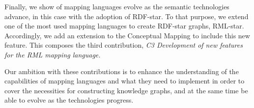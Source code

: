 Finally, we show of mapping languages evolve as the semantic technologies advance, in this case with the adoption of RDF-star. To that purpose, we extend one of the most used mapping languages to create RDF-star graphs, RML-star. Accordingly, we add an extension to the Conceptual Mapping to include this new feature. This composes the third contribution, \textit{C3 Development of new features for the RML mapping language.}

Our ambition with these contributions is to enhance the understanding of the capabilities of mapping languages and what they need to implement in order to cover the necessities for constructing knowledge graphs, and at the same time be able to evolve as the technologies progress.